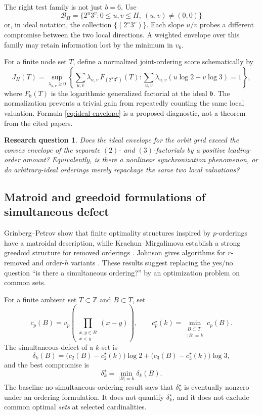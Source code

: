 \documentclass[10pt,letterpaper]{article}
\newtheorem{question}{Research question}[section]
\newcommand{\Z}{\mathbb Z}
\begin{document}
The right test family is not just \(b=6\).  Use
\[
  \mathcal B_H=\{2^u3^v:0\leq u,v\leq H,\ (u,v)\neq(0,0)\}
\]
or, in ideal notation, the collection \(\{(2^u3^v)\}\).  Each slope \(u/v\) probes a
different compromise between the two local directions.  A weighted envelope over this
family may retain information lost by the minimum in \(v_6\).

For a finite node set \(T\), define a normalized joint-ordering score schematically by
\begin{equation}
  J_H(T)=\sup_{\lambda_{u,v}\geq0}
  \left\{
    \sum_{u,v}\lambda_{u,v}\,F_{(2^u3^v)}(T):
    \sum_{u,v}\lambda_{u,v}(u\log2+v\log3)=1
  \right\},
  \label{eq:ideal-envelope}
\end{equation}
where \(F_{\mathfrak b}(T)\) is the logarithmic generalized factorial at the ideal
\(\mathfrak b\).  The normalization prevents a trivial gain from repeatedly counting the
same local valuation.  Formula \cref{eq:ideal-envelope} is a proposed diagnostic, not a
theorem from the cited papers.

\begin{question}
Does the ideal envelope for the orbit grid exceed the convex envelope of the separate
\((2)\)- and \((3)\)-factorials by a positive leading-order amount?  Equivalently, is there a
nonlinear synchronization phenomenon, or do arbitrary-ideal orderings merely repackage the
same two local valuations?
\end{question}

\subsection{Matroid and greedoid formulations of simultaneous defect}

Grinberg--Petrov show that finite optimality structures inspired by \(p\)-orderings have a
matroidal description, while Krachun--Mirgalimova establish a strong greedoid structure for
removed orderings \cite{GrinbergPetrov,KrachunMirgalimova}.  Johnson gives algorithms for
\(r\)-removed and order-\(h\) variants \cite{Johnson2010}.  These results suggest replacing
the yes/no question ``is there a simultaneous ordering?'' by an optimization problem on
common sets.

For a finite ambient set \(T\subset\Z\) and \(B\subset T\), set
\[
  c_p(B)=v_p\!\left(\prod_{\substack{x,y\in B\\x<y}}(x-y)\right),
  \qquad
  c_p^\star(k)=\min_{\substack{B\subset T\\|B|=k}}c_p(B).
\]
The simultaneous defect of a \(k\)-set is
\[
  \delta_k(B)
  =\bigl(c_2(B)-c_2^\star(k)\bigr)\log2
   +\bigl(c_3(B)-c_3^\star(k)\bigr)\log3,
\]
and the best compromise is
\begin{equation}
  \delta_k^\star=\min_{|B|=k}\delta_k(B).
  \label{eq:matroid-defect}
\end{equation}
The baseline no-simultaneous-ordering result says that \(\delta_k^\star\) is eventually
nonzero under an ordering formulation.  It does not quantify \(\delta_k^\star\), and it does
not exclude common optimal \emph{sets} at selected cardinalities.
\end{document}

